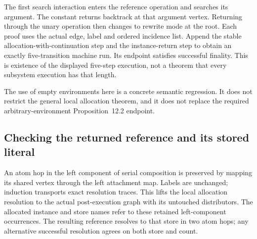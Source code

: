 






The first search interaction enters the reference operation and searches
its argument. The constant returns backtrack at that argument vertex. Returning
through the unary operation then changes to rewrite mode at the root. Each
proof uses the actual edge, label and ordered incidence list. Append the
stable allocation-with-continuation step and the instance-return step to obtain
an exactly five-transition machine run. Its endpoint satisfies successful
finality. This is existence of the displayed five-step execution, not a theorem
that every subsystem execution has that length.

The use of empty environments here is a concrete semantic regression. It does
not restrict the general local allocation theorem, and it does not replace the
required arbitrary-environment Proposition~12.2 endpoint.






\subsection{Checking the returned reference and its stored literal}

An atom hop in the left component of serial composition is preserved by
mapping its shared vertex through the left attachment map. Labels are unchanged;
induction transports exact resolution traces. This lifts the local allocation
resolution to the actual post-execution graph with its untouched distributors.
The allocated instance and store names refer to these retained left-component
occurrences. The resulting reference resolves to that store in two atom hops;
any alternative successful resolution agrees on both store and count.

